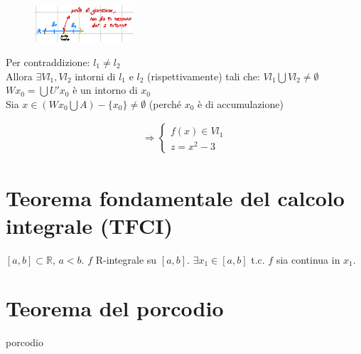 \documentclass{article}
\newcommand{\R}{\mathbb{R}}
\begin{document}
\begin{flushleft}
\begin{figure}[h]
    \centering
    \includegraphics[width=10em]{./images/unicitaLimite.PNG}
\end{figure}

Per contraddizione: $l_1 \neq l_2$
\\Allora $\exists Vl_1, Vl_2$ intorni di $l_1$ e $l_2$ (rispettivamente) tali che: $Vl_1 \bigcup Vl_2 \neq \emptyset$
\\$Wx_0 = \bigcup U'x_0$ è un intorno di $x_0$
\\Sia $x \in(Wx_0 \bigcup A) - \{x_0\} \neq \emptyset$ (perché $x_0$ è di accumulazione)

\begin{align*}
    \Rightarrow
    \begin{cases}
        f(x) \in Vl_1 \\
        z = x^2 - 3
    \end{cases}
\end{align*}


\section{Teorema fondamentale del calcolo integrale (TFCI)}
 $[a,b] \subset \R$, $a < b$. $f$ R-integrale su $[a,b]$.
 $\exists x_1 \in [a,b]$ t.c. $f$ sia continua in $x_1$.

\section{Teorema del porcodio}
porcodio
\end{flushleft}
\end{document}
